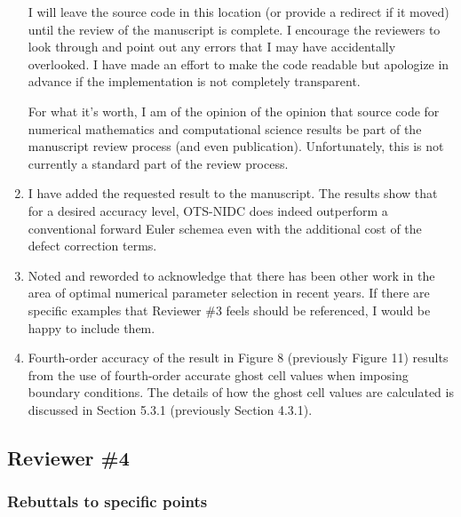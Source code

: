 \documentclass[12pt]{article}
\begin{document}
\begin{enumerate}
      I will leave the source code in this location (or provide a redirect if it
      moved) until the review of the manuscript is complete.  I encourage the
      reviewers to look through and point out any errors that I may have
      accidentally overlooked.  I have made an effort to make the code readable
      but apologize in advance if the implementation is not completely
      transparent.
    
      For what it's worth, I am of the opinion of the opinion that source code
      for numerical mathematics and computational science results be part of the
      manuscript review process (and even publication).  Unfortunately, this is
      not currently a standard part of the review process.

\item I have added the requested result to the manuscript. The results show
      that for a desired accuracy level, OTS-NIDC does indeed outperform a
      conventional forward Euler schemea even with the additional cost of the
      defect correction terms.

\item Noted and reworded to acknowledge that there has been other work in the
      area of optimal numerical parameter selection in recent years.  If there
      are specific examples that Reviewer \#3 feels should be referenced, I
      would be happy to include them.

\item Fourth-order accuracy of the result in Figure 8 (previously Figure 11)
      results from the use of fourth-order accurate ghost cell values when
      imposing boundary conditions.  The details of how the ghost cell values
      are calculated is discussed in Section 5.3.1 (previously Section 4.3.1).

\end{enumerate}

\subsection*{Reviewer \#4}

\subsubsection*{Rebuttals to specific points}
\end{document}
